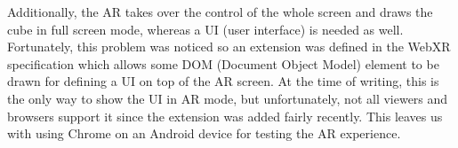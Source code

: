 Additionally, the AR takes over the control of the whole screen and draws the cube in full screen mode, whereas a UI (user interface) is needed
as well. Fortunately, this problem was noticed so an extension was defined in the WebXR specification which allows some DOM (Document Object Model)
element to be drawn for defining a UI on top of the AR screen. At the time of writing, this is the only way to show the UI in AR mode, but
unfortunately, not all viewers and browsers support it since the extension was added fairly recently. This leaves us with using Chrome on an Android
device for testing the AR experience.
